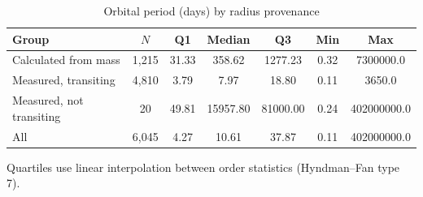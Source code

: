 \begin{table}[t]
\centering
\begin{threeparttable}
\caption{Orbital period (days) by radius provenance}
\label{tab:period_stats}
\begin{tabular}{lcccccc}
\toprule
Group & $N$ & Q1 & Median & Q3 & Min & Max \\
\midrule
Calculated from mass & 1,215 & 31.33 & 358.62 & 1277.23 & 0.32 & 7300000.0 \\
Measured, transiting & 4,810 & 3.79 & 7.97 & 18.80 & 0.11 & 3650.0 \\
Measured, not transiting & 20 & 49.81 & 15957.80 & 81000.00 & 0.24 & 402000000.0 \\
All & 6,045 & 4.27 & 10.61 & 37.87 & 0.11 & 402000000.0 \\
\bottomrule
\end{tabular}
\begin{tablenotes}[flushleft]
\footnotesize
\item Quartiles use linear interpolation between order statistics (Hyndman--Fan type 7).
\end{tablenotes}
\end{threeparttable}
\end{table}
